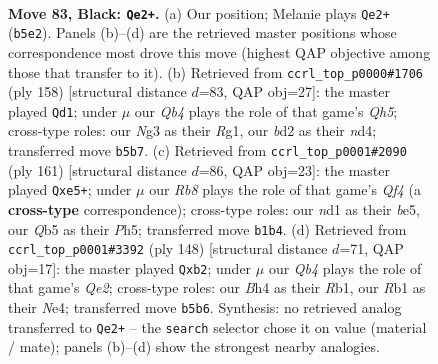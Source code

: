 \documentclass[11pt]{article}
\begin{document}
\clearpage

\begin{figure}[p]\centering
\begin{subfigure}{0.46\textwidth}\centering
\resizebox{\linewidth}{!}{%
\newchessgame
\chessboard[
  setfen={8/6k1/8/Pqp2p2/3p1Ppb/4P1n1/R1QB3K/1r1N4 b - - 10 83},
  showmover=false,
  pgfstyle=straightmove, color=movearrow, markmove={b5-e2}
]}
\caption{}
\end{subfigure}\hfill
\begin{subfigure}{0.46\textwidth}\centering
\resizebox{\linewidth}{!}{%
\newchessgame
\chessboard[
  setfen={8/8/1p1N1r1p/3P3Q/2Pnpq2/Pp6/1P3k2/K5R1 w - - 17 80},
  showmover=false,
  pgfstyle=straightmove, color=movearrow, markmove={h5-d1}
]}
\caption{}
\end{subfigure}
\\[4pt]
\begin{subfigure}{0.46\textwidth}\centering
\resizebox{\linewidth}{!}{%
\newchessgame
\chessboard[
  setfen={6Q1/8/1p2r2k/2p1Bq1p/8/2P2P1p/3R2PK/8 b - - 0 81},
  showmover=false,
  pgfstyle=straightmove, color=movearrow, markmove={f5-e5}
]}
\caption{}
\end{subfigure}\hfill
\begin{subfigure}{0.46\textwidth}\centering
\resizebox{\linewidth}{!}{%
\newchessgame
\chessboard[
  setfen={7k/5p2/2p1p2P/2P2rP1/3qNb2/5P1K/1p2Q3/1R6 w - - 0 75},
  showmover=false,
  pgfstyle=straightmove, color=movearrow, markmove={e2-b2}
]}
\caption{}
\end{subfigure}
\caption{\textbf{Move 83, Black: \texttt{Qe2+}.} (a) Our position; Melanie plays \texttt{Qe2+} (\texttt{b5e2}). Panels (b)--(d) are the retrieved master positions whose correspondence most drove this move (highest QAP objective among those that transfer to it). (b) Retrieved from \texttt{ccrl\_top\_p0000\#1706} (ply 158) [structural distance $d$=83, QAP obj=27]: the master played \texttt{Qd1}; under $\mu$ our \emph{Qb4} plays the role of that game's \emph{Qh5}; cross-type roles: our \emph{N}g3 as their \emph{R}g1, our \emph{b}d2 as their \emph{n}d4; transferred move \texttt{b5b7}. (c) Retrieved from \texttt{ccrl\_top\_p0001\#2090} (ply 161) [structural distance $d$=86, QAP obj=23]: the master played \texttt{Qxe5+}; under $\mu$ our \emph{Rb8} plays the role of that game's \emph{Qf4} (a \textbf{cross-type} correspondence); cross-type roles: our \emph{n}d1 as their \emph{b}e5, our \emph{Q}b5 as their \emph{P}h5; transferred move \texttt{b1b4}. (d) Retrieved from \texttt{ccrl\_top\_p0001\#3392} (ply 148) [structural distance $d$=71, QAP obj=17]: the master played \texttt{Qxb2}; under $\mu$ our \emph{Qb4} plays the role of that game's \emph{Qe2}; cross-type roles: our \emph{B}h4 as their \emph{R}b1, our \emph{R}b1 as their \emph{N}e4; transferred move \texttt{b5b6}. Synthesis: no retrieved analog transferred to \texttt{Qe2+} -- the \texttt{search} selector chose it on value (material / mate); panels (b)--(d) show the strongest nearby analogies.}
\label{fig:thought-m165}
\end{figure}
\end{document}

